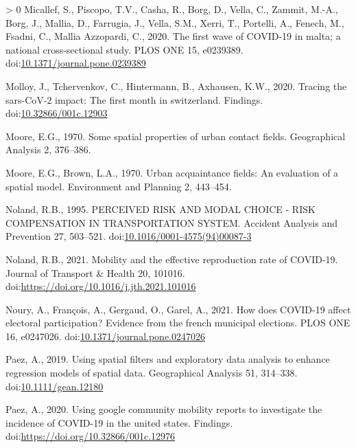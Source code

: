 \documentclass[]{elsarticle} %
\newlength{\cslhangindent}
\newenvironment{CSLReferences}[3] %
 {%
  \setlength{\parindent}{0pt}
  \ifodd #1 \everypar{\setlength{\hangindent}{\cslhangindent}}\ignorespaces\fi
  \ifnum #2 > 0
  \setlength{\parskip}{#2\baselineskip}
  \fi
 }%
 {}
\begin{document}
\begin{CSLReferences}{1}{0}
\leavevmode\hypertarget{ref-Micallef2020first}{}%
Micallef, S., Piscopo, T.V., Casha, R., Borg, D., Vella, C., Zammit,
M.-A., Borg, J., Mallia, D., Farrugia, J., Vella, S.M., Xerri, T.,
Portelli, A., Fenech, M., Fsadni, C., Mallia Azzopardi, C., 2020. The
first wave of COVID-19 in malta; a national cross-sectional study. PLOS
ONE 15, e0239389.
doi:\href{https://doi.org/10.1371/journal.pone.0239389}{10.1371/journal.pone.0239389}

\leavevmode\hypertarget{ref-Molloy2020Tracing}{}%
Molloy, J., Tchervenkov, C., Hintermann, B., Axhausen, K.W., 2020.
Tracing the sars-CoV-2 impact: The first month in switzerland. Findings.
doi:\href{https://doi.org/10.32866/001c.12903}{10.32866/001c.12903}

\leavevmode\hypertarget{ref-Moore1970some}{}%
Moore, E.G., 1970. Some spatial properties of urban contact fields.
Geographical Analysis 2, 376--386.

\leavevmode\hypertarget{ref-Moore1970urban}{}%
Moore, E.G., Brown, L.A., 1970. Urban acquaintance fields: An evaluation
of a spatial model. Environment and Planning 2, 443--454.

\leavevmode\hypertarget{ref-Noland1995perceived}{}%
Noland, R.B., 1995. PERCEIVED RISK AND MODAL CHOICE - RISK COMPENSATION
IN TRANSPORTATION SYSTEM. Accident Analysis and Prevention 27, 503--521.
doi:\href{https://doi.org/10.1016/0001-4575(94)00087-3}{10.1016/0001-4575(94)00087-3}

\leavevmode\hypertarget{ref-Noland2021mobility}{}%
Noland, R.B., 2021. Mobility and the effective reproduction rate of
COVID-19. Journal of Transport \& Health 20, 101016.
doi:\url{https://doi.org/10.1016/j.jth.2021.101016}

\leavevmode\hypertarget{ref-Noury2021how}{}%
Noury, A., François, A., Gergaud, O., Garel, A., 2021. How does COVID-19
affect electoral participation? Evidence from the french municipal
elections. PLOS ONE 16, e0247026.
doi:\href{https://doi.org/10.1371/journal.pone.0247026}{10.1371/journal.pone.0247026}

\leavevmode\hypertarget{ref-Paez2019using}{}%
Paez, A., 2019. Using spatial filters and exploratory data analysis to
enhance regression models of spatial data. Geographical Analysis 51,
314--338.
doi:\href{https://doi.org/10.1111/gean.12180}{10.1111/gean.12180}

\leavevmode\hypertarget{ref-Paez2020using}{}%
Paez, A., 2020. Using google community mobility reports to investigate
the incidence of COVID-19 in the united states. Findings.
doi:\url{https://doi.org/10.32866/001c.12976}


\end{CSLReferences}
\end{document}
